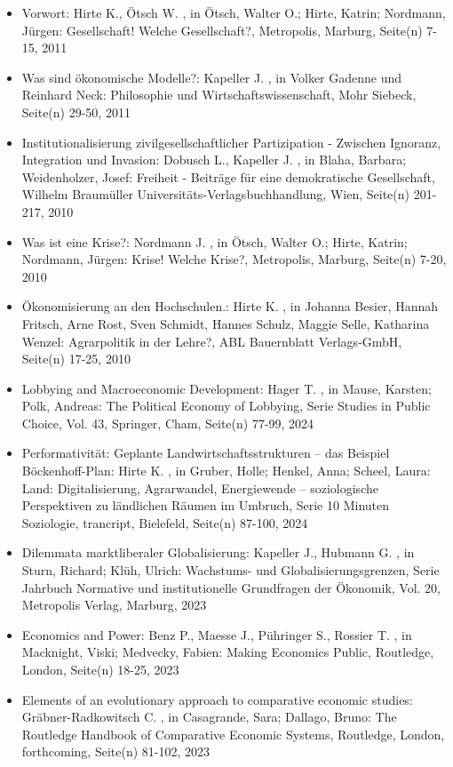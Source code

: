 \begin{itemize}
\item Vorwort: Hirte K., Ötsch W. , in Ötsch, Walter O.; Hirte, Katrin; Nordmann, Jürgen: Gesellschaft! Welche Gesellschaft?, Metropolis, Marburg, Seite(n) 7-15, 2011
\item Was sind ökonomische Modelle?: Kapeller J. , in Volker Gadenne und Reinhard Neck: Philosophie und Wirtschaftswissenschaft, Mohr Siebeck, Seite(n) 29-50, 2011
\item Institutionalisierung zivilgesellschaftlicher Partizipation - Zwischen Ignoranz, Integration und Invasion: Dobusch L., Kapeller J. , in Blaha, Barbara; Weidenholzer, Josef: Freiheit - Beiträge für eine demokratische Gesellschaft, Wilhelm Braumüller Universitäts-Verlagsbuchhandlung, Wien, Seite(n) 201-217, 2010
\item Was ist eine Krise?: Nordmann J. , in Ötsch, Walter O.; Hirte, Katrin; Nordmann, Jürgen: Krise! Welche Krise?, Metropolis, Marburg, Seite(n) 7-20, 2010
\item Ökonomisierung an den Hochschulen.: Hirte K. , in Johanna Besier, Hannah Fritsch, Arne Rost, Sven Schmidt, Hannes Schulz, Maggie Selle, Katharina Wenzel: Agrarpolitik in der Lehre?, ABL Bauernblatt Verlags-GmbH, Seite(n) 17-25, 2010
\item Lobbying and Macroeconomic Development: Hager T. , in Mause, Karsten; Polk, Andreas: The Political Economy of Lobbying, Serie Studies in Public Choice, Vol. 43, Springer, Cham, Seite(n) 77-99, 2024
\item Performativität: Geplante Landwirtschaftsstrukturen – das Beispiel Böckenhoff-Plan: Hirte K. , in Gruber, Holle; Henkel, Anna; Scheel, Laura: Land: Digitalisierung, Agrarwandel, Energiewende – soziologische Perspektiven zu ländlichen Räumen im Umbruch, Serie 10 Minuten Soziologie, trancript, Bielefeld, Seite(n) 87-100, 2024
\item Dilemmata marktliberaler Globalisierung: Kapeller J., Hubmann G. , in Sturn, Richard; Klüh, Ulrich: Wachstums- und Globalisierungsgrenzen, Serie Jahrbuch Normative und institutionelle Grundfragen der Ökonomik, Vol. 20, Metropolis Verlag, Marburg, 2023
\item Economics and Power: Benz P., Maesse J., Pühringer S., Rossier T. , in Macknight, Viski; Medvecky, Fabien: Making Economics Public, Routledge, London, Seite(n) 18-25, 2023
\item Elements of an evolutionary approach to comparative economic studies: Gräbner-Radkowitsch C. , in Casagrande, Sara; Dallago, Bruno: The Routledge Handbook of Comparative Economic Systems, Routledge, London, forthcoming, Seite(n) 81-102, 2023

\end{itemize}
